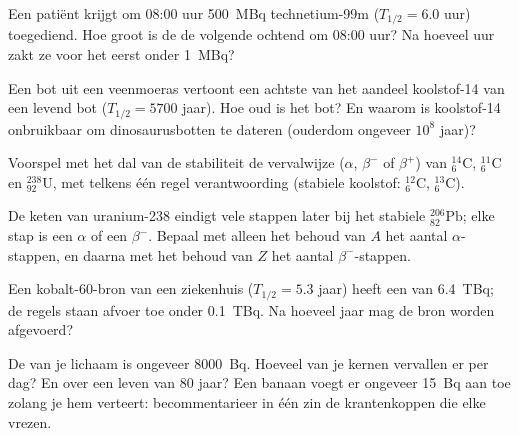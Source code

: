 \begin{exercise}[$\star\star$]\label{exo:g11:nucleus-radioactivity:9}
Een patiënt krijgt om 08:00 uur \qty{500}{MBq} technetium-99m
($T_{1/2} = 6.0$ uur) toegediend. Hoe groot is de  de volgende
ochtend om 08:00 uur? Na hoeveel uur zakt ze voor het eerst onder
\qty{1}{MBq}?
\end{exercise}

\begin{exercise}[$\star\star$]\label{exo:g11:nucleus-radioactivity:10}
Een bot uit een veenmoeras vertoont een achtste van het aandeel
koolstof-14 van een levend bot ($T_{1/2} = \num{5700}$ jaar). Hoe oud is
het bot? En waarom is koolstof-14 onbruikbaar om dinosaurusbotten te
dateren (ouderdom ongeveer $10^{8}$ jaar)?
\end{exercise}

\begin{exercise}[$\star\star$]\label{exo:g11:nucleus-radioactivity:11}
Voorspel met het dal van de stabiliteit de vervalwijze ($\alpha$,
$\beta^-$ of $\beta^+$) van ${}^{14}_{6}\mathrm{C}$,
${}^{11}_{6}\mathrm{C}$ en ${}^{238}_{92}\mathrm{U}$, met telkens één
regel verantwoording (stabiele koolstof: ${}^{12}_{6}\mathrm{C}$,
${}^{13}_{6}\mathrm{C}$).
\end{exercise}

\begin{exercise}[$\star\star\star$]\label{exo:g11:nucleus-radioactivity:12}
De keten van uranium-238 eindigt vele stappen later bij het stabiele
${}^{206}_{82}\mathrm{Pb}$; elke stap is een $\alpha$ of een $\beta^-$.
Bepaal met alleen het behoud van $A$ het aantal $\alpha$-stappen, en
daarna met het behoud van $Z$ het aantal $\beta^-$-stappen.
\end{exercise}

\begin{exercise}[$\star\star\star$]\label{exo:g11:nucleus-radioactivity:13}
Een kobalt-60-bron van een ziekenhuis ($T_{1/2} = 5.3$ jaar) heeft een
 van \qty{6.4}{TBq}; de regels staan afvoer toe onder
\qty{0.1}{TBq}. Na hoeveel jaar mag de bron worden afgevoerd?
\end{exercise}

\begin{exercise}[$\star\star\star$]\label{exo:g11:nucleus-radioactivity:14}
De  van je lichaam is ongeveer \qty{8000}{Bq}. Hoeveel van je
kernen vervallen er per dag? En over een leven van $80$ jaar? Een banaan
voegt er ongeveer \qty{15}{Bq} aan toe zolang je hem verteert:
becommentarieer in één zin de krantenkoppen die elke  vrezen.
\end{exercise}

